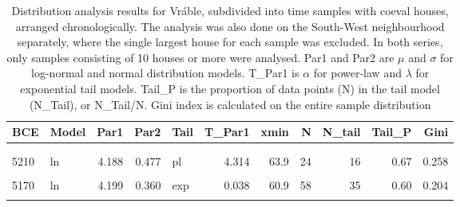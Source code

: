 \documentclass[
  12pt,
]{book}
\begin{document}
\begin{landscape}\begin{table}

\caption{\label{tab:06-time-tab}Distribution analysis results for Vráble, subdivided into time samples with coeval houses, arranged chronologically. The analysis was also done on the South-West neighbourhood separately, where the single largest house for each sample was excluded. In both series, only samples consisting of 10 houses or more were analysed. Par1 and Par2 are \(\mu\) and \(\sigma\) for log-normal and normal distribution models. T\_Par1 is \(\alpha\) for power-law and \(\lambda\) for exponential tail models. Tail\_P is the proportion of data points (N) in the tail model (N\_Tail), or N\_Tail/N. Gini index is calculated on the entire sample distribution}
\centering
\begin{tabular}[t]{llrrlrrrrrr}
\toprule
BCE & Model & Par1 & Par2 & Tail & T\_Par1 & xmin & N & N\_tail & Tail\_P & Gini\\
\midrule
\addlinespace[0.3em]
\multicolumn{11}{l}{\textbf{Vráble}}\\
\hspace{1em}\cellcolor{gray!6}{5230} & \cellcolor{gray!6}{ln} & \cellcolor{gray!6}{4.059} & \cellcolor{gray!6}{0.487} & \cellcolor{gray!6}{pl} & \cellcolor{gray!6}{4.232} & \cellcolor{gray!6}{63.5} & \cellcolor{gray!6}{12} & \cellcolor{gray!6}{6} & \cellcolor{gray!6}{0.50} & \cellcolor{gray!6}{0.279}\\
\hspace{1em}5210 & ln & 4.188 & 0.477 & pl & 4.314 & 63.9 & 24 & 16 & 0.67 & 0.258\\
\hspace{1em}\cellcolor{gray!6}{5190} & \cellcolor{gray!6}{ln} & \cellcolor{gray!6}{4.114} & \cellcolor{gray!6}{0.372} & \cellcolor{gray!6}{exp} & \cellcolor{gray!6}{0.041} & \cellcolor{gray!6}{51.4} & \cellcolor{gray!6}{38} & \cellcolor{gray!6}{28} & \cellcolor{gray!6}{0.74} & \cellcolor{gray!6}{0.210}\\
\hspace{1em}5170 & ln & 4.199 & 0.360 & exp & 0.038 & 60.9 & 58 & 35 & 0.60 & 0.204\\
\hspace{1em}\cellcolor{gray!6}{5150} & \cellcolor{gray!6}{ln} & \cellcolor{gray!6}{4.288} & \cellcolor{gray!6}{0.398} & \cellcolor{gray!6}{pl} & \cellcolor{gray!6}{5.235} & \cellcolor{gray!6}{85.0} & \cellcolor{gray!6}{53} & \cellcolor{gray!6}{22} & \cellcolor{gray!6}{0.42} & \cellcolor{gray!6}{0.228}\\

\end{tabular}
\end{table}
\end{landscape}
\end{document}
